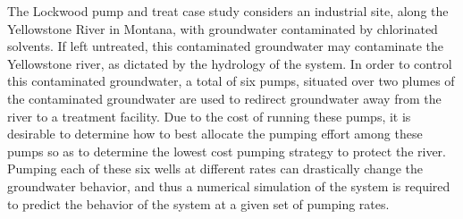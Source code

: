 \documentclass[12pt]{article}
\begin{document}
%
%


The Lockwood pump and treat case study considers an industrial site, along the Yellowstone River in Montana, with groundwater contaminated by chlorinated solvents. %
%
If left untreated, this contaminated groundwater may contaminate the Yellowstone river, as dictated by the hydrology of the system. %
In order to control this contaminated groundwater, a total of six pumps, situated over two plumes of the contaminated groundwater are used to redirect groundwater away from the river to a treatment facility.
%
Due to the cost of running these pumps, it is desirable to determine how to best allocate the pumping effort among these pumps so as to determine the lowest cost pumping strategy to protect the river.
%
Pumping each of these six wells at different rates can drastically change the groundwater behavior, and  thus a numerical simulation of the system is required to predict the behavior of the system at a given set of pumping rates. %
%
%

%
%
\end{document}
